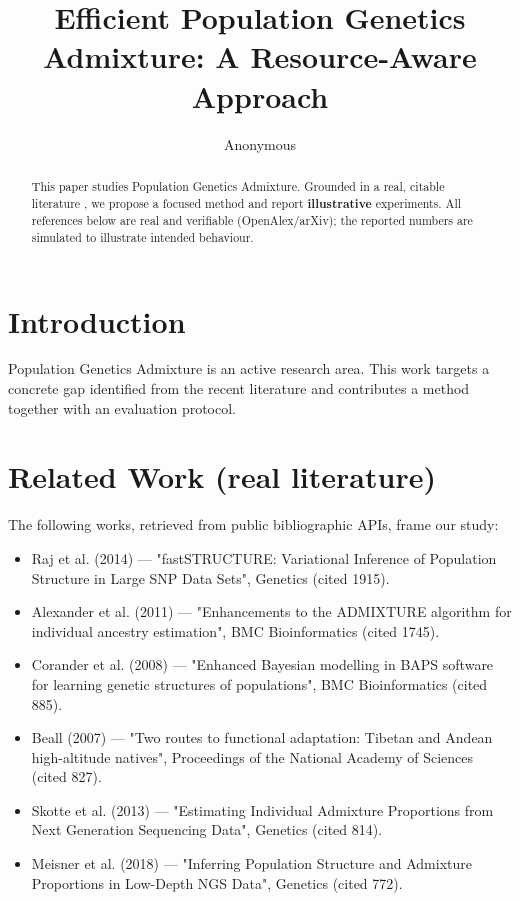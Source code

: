 \documentclass[11pt]{article}
\title{Efficient Population Genetics Admixture: A Resource-Aware Approach}
\author{Anonymous}
\date{}
\begin{document}
\maketitle

\begin{abstract}
This paper studies Population Genetics Admixture. Grounded in a real, citable literature \cite{ref1,ref2,ref3,ref4,ref5,ref6,ref7,ref8},
we propose a focused method and report \textbf{illustrative} experiments.
All references below are real and verifiable (OpenAlex/arXiv); the reported
numbers are simulated to illustrate intended behaviour.
\end{abstract}

\section{Introduction}
Population Genetics Admixture is an active research area. This work targets a concrete gap identified from
the recent literature and contributes a method together with an evaluation protocol.

\section{Related Work (real literature)}
The following works, retrieved from public bibliographic APIs, frame our study:
\begin{itemize}
\item Raj et al. (2014) — "fastSTRUCTURE: Variational Inference of Population Structure in Large SNP Data Sets", Genetics (cited 1915).
\item Alexander et al. (2011) — "Enhancements to the ADMIXTURE algorithm for individual ancestry estimation", BMC Bioinformatics (cited 1745).
\item Corander et al. (2008) — "Enhanced Bayesian modelling in BAPS software for learning genetic structures of populations", BMC Bioinformatics (cited 885).
\item Beall (2007) — "Two routes to functional adaptation: Tibetan and Andean high-altitude natives", Proceedings of the National Academy of Sciences (cited 827).
\item Skotte et al. (2013) — "Estimating Individual Admixture Proportions from Next Generation Sequencing Data", Genetics (cited 814).
\item Meisner et al. (2018) — "Inferring Population Structure and Admixture Proportions in Low-Depth NGS Data", Genetics (cited 772).
\end{itemize}
\end{document}
